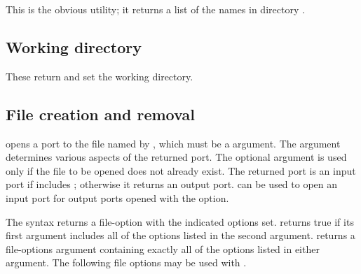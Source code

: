 \begin{protos}
\end{protos}
\noindent
This is the obvious utility; it returns a list of the names in directory
 .

\subsection{Working directory}

\begin{protos}
\end{protos}
\noindent
These return and set the working directory.

\subsection{File creation and removal}

\begin{protos}
\end{protos}
\noindent
{} opens a port to the file named by , which
must be a  argument.
The  argument determines various aspects of the
 returned port.
The optional  argument is used only if the file to be opened
 does not already exist.
The returned port is an input port if  includes
 ; otherwise it returns an output port.
 can be used to open an input port for
 output ports opened with the  option.

\begin{protos}
\end{protos}
\noindent
The syntax  returns a file-option with the
 indicated options set.
 returns true if its first argument includes all of
 the options listed in the second argument.  
returns a file-options argument containing exactly all of the options
listed in either argument.
The following file options may be used with .

